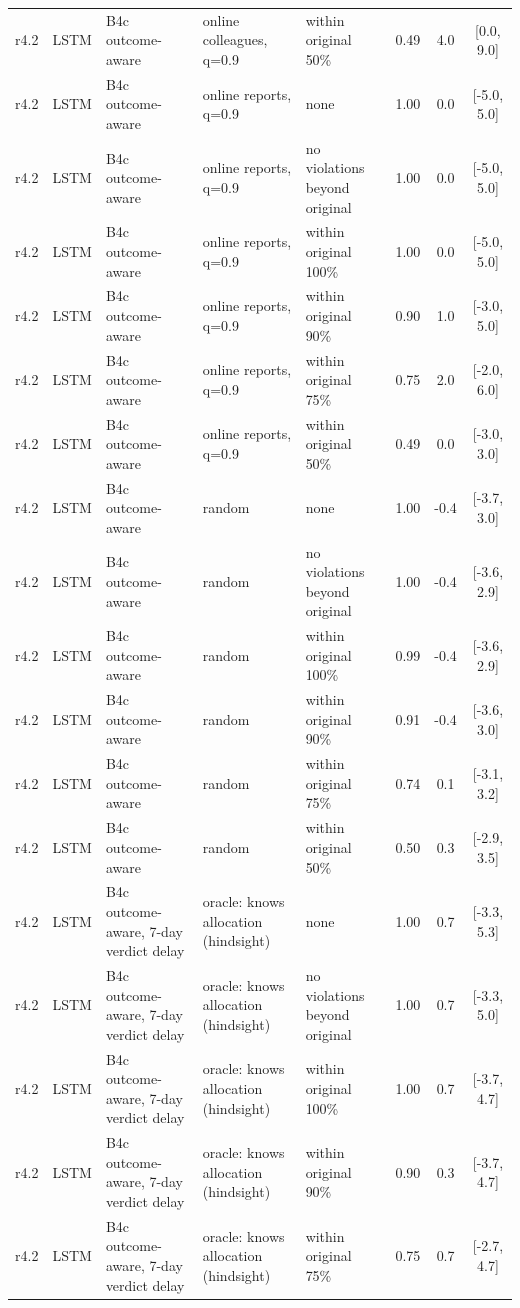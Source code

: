\begin{longtable}{lllp{4.2cm}p{3.4cm}ccc}
r4.2 & LSTM & B4c outcome-aware & online colleagues, q=0.9 & within original 50\% & 0.49 & 4.0 & [0.0, 9.0] \\
r4.2 & LSTM & B4c outcome-aware & online reports, q=0.9 & none & 1.00 & 0.0 & [-5.0, 5.0] \\
r4.2 & LSTM & B4c outcome-aware & online reports, q=0.9 & no violations beyond original & 1.00 & 0.0 & [-5.0, 5.0] \\
r4.2 & LSTM & B4c outcome-aware & online reports, q=0.9 & within original 100\% & 1.00 & 0.0 & [-5.0, 5.0] \\
r4.2 & LSTM & B4c outcome-aware & online reports, q=0.9 & within original 90\% & 0.90 & 1.0 & [-3.0, 5.0] \\
r4.2 & LSTM & B4c outcome-aware & online reports, q=0.9 & within original 75\% & 0.75 & 2.0 & [-2.0, 6.0] \\
r4.2 & LSTM & B4c outcome-aware & online reports, q=0.9 & within original 50\% & 0.49 & 0.0 & [-3.0, 3.0] \\
r4.2 & LSTM & B4c outcome-aware & random & none & 1.00 & -0.4 & [-3.7, 3.0] \\
r4.2 & LSTM & B4c outcome-aware & random & no violations beyond original & 1.00 & -0.4 & [-3.6, 2.9] \\
r4.2 & LSTM & B4c outcome-aware & random & within original 100\% & 0.99 & -0.4 & [-3.6, 2.9] \\
r4.2 & LSTM & B4c outcome-aware & random & within original 90\% & 0.91 & -0.4 & [-3.6, 3.0] \\
r4.2 & LSTM & B4c outcome-aware & random & within original 75\% & 0.74 & 0.1 & [-3.1, 3.2] \\
r4.2 & LSTM & B4c outcome-aware & random & within original 50\% & 0.50 & 0.3 & [-2.9, 3.5] \\
r4.2 & LSTM & B4c outcome-aware, 7-day verdict delay & oracle: knows allocation (hindsight) & none & 1.00 & 0.7 & [-3.3, 5.3] \\
r4.2 & LSTM & B4c outcome-aware, 7-day verdict delay & oracle: knows allocation (hindsight) & no violations beyond original & 1.00 & 0.7 & [-3.3, 5.0] \\
r4.2 & LSTM & B4c outcome-aware, 7-day verdict delay & oracle: knows allocation (hindsight) & within original 100\% & 1.00 & 0.7 & [-3.7, 4.7] \\
r4.2 & LSTM & B4c outcome-aware, 7-day verdict delay & oracle: knows allocation (hindsight) & within original 90\% & 0.90 & 0.3 & [-3.7, 4.7] \\
r4.2 & LSTM & B4c outcome-aware, 7-day verdict delay & oracle: knows allocation (hindsight) & within original 75\% & 0.75 & 0.7 & [-2.7, 4.7] \\

\end{longtable}

